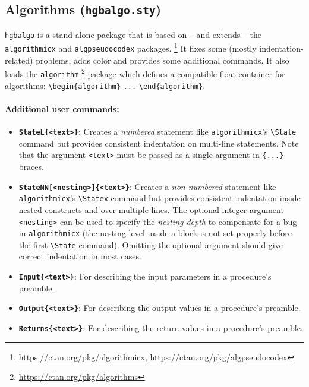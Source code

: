 \documentclass[english]{hgbarticle}
\begin{document}
\subsection{Algorithms (\texttt{hgbalgo.sty})}

\texttt{hgbalgo} is a stand-alone package that is based on -- and extends -- the \texttt{algorithmicx} and 
\texttt{algpseudocodex} packages.%
\footnote{\url{https://ctan.org/pkg/algorithmicx}, \url{https://ctan.org/pkg/algpseudocodex}}
It fixes some (mostly indentation-related) problems, adds color and provides some additional
commands. It also loads the \texttt{algorithm}%
\footnote{\url{https://ctan.org/pkg/algorithms}}
package which defines a compatible float container for algorithms:
\verb!\begin{algorithm}! \verb!...! \verb!\end{algorithm}!.


\paragraph{Additional user commands:}
\begin{itemize}
\item 
\textbf{\texttt{{\bs}StateL\{<text>\}}}: Creates a \emph{numbered} statement like \texttt{algorithmicx}'s 
\verb!\State! command but provides consistent indentation on multi-line statements.
Note that the argument \texttt{<text>} must be passed as a single argument in \verb!{...}! braces.
\item
\textbf{\texttt{{\bs}StateNN[<nesting>]\{<text>\}}}: 
Creates a \emph{non-numbered} statement like \texttt{algo\-rith\-micx}'s \verb!\Statex! 
command but provides consistent indentation inside nested constructs and over multiple lines.
The optional integer argument \verb!<nesting>! can be used to specify the \emph{nesting depth}
to compensate for a bug in \texttt{algorithmicx} (the nesting level inside a block is not set properly before 
the first \verb!\State! command). Omitting the optional argument should give correct indentation in most
cases.
\item
\textbf{\texttt{{\bs}Input\{<text>\}}}:
For describing the input parameters in a procedure's preamble. %
\item
\textbf{\texttt{{\bs}Output\{<text>\}}}:
For describing the output values in a procedure's preamble. %
\item
\textbf{\texttt{{\bs}Returns\{<text>\}}}:
For describing the return values in a procedure's preamble. %
\end{itemize}
\end{document}
